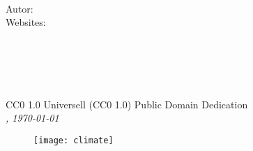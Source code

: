 \newpage
~\vfill
\thispagestyle{empty}

\noindent Autor: \autor\\

\noindent Websites:\\
\noindent \textsc{\websiteOne}\\
\noindent \textsc{\websiteTwo}\\
\noindent \textsc{\websiteThree}\\
\noindent \textsc{\websiteFour}\\
\noindent \textsc{\websiteFive}\\

\noindent \ccLogo \hspace{0.1cm} \ccZero \hspace{0.1cm} CC0 1.0 Universell (CC0 1.0) Public Domain Dedication \\

\noindent \textit{\version, \today}

\begin{figure}[htb]
    \texttt{[image: climate]}
\end{figure}
